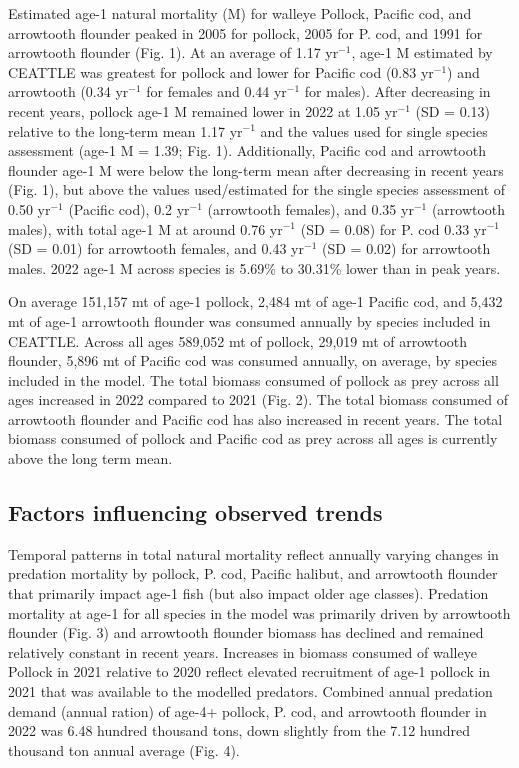 \documentclass[
]{article}
\begin{document}
Estimated age-1 natural mortality (M) for walleye Pollock, Pacific cod,
and arrowtooth flounder peaked in 2005 for pollock, 2005 for P. cod, and
1991 for arrowtooth flounder (Fig. 1). At an average of 1.17
yr\(^{-1}\), age-1 M estimated by CEATTLE was greatest for pollock and
lower for Pacific cod (0.83 yr\(^{-1}\)) and arrowtooth (0.34
yr\(^{-1}\) for females and 0.44 yr\(^{-1}\) for males). After
decreasing in recent years, pollock age-1 M remained lower in 2022 at
1.05 yr\(^{-1}\) (SD = 0.13) relative to the long-term mean 1.17
yr\(^{-1}\) and the values used for single species assessment (age-1 M =
1.39; Fig. 1). Additionally, Pacific cod and arrowtooth flounder age-1 M
were below the long-term mean after decreasing in recent years (Fig. 1),
but above the values used/estimated for the single species assessment of
0.50 yr\(^{-1}\) (Pacific cod), 0.2 yr\(^{-1}\) (arrowtooth females),
and 0.35 yr\(^{-1}\) (arrowtooth males), with total age-1 M at around
0.76 yr\(^{-1}\) (SD = 0.08) for P. cod 0.33 yr\(^{-1}\) (SD = 0.01) for
arrowtooth females, and 0.43 yr\(^{-1}\) (SD = 0.02) for arrowtooth
males. 2022 age-1 M across species is 5.69\% to 30.31\% lower than in
peak years.

On average 151,157 mt of age-1 pollock, 2,484 mt of age-1 Pacific cod,
and 5,432 mt of age-1 arrowtooth flounder was consumed annually by
species included in CEATTLE. Across all ages 589,052 mt of pollock,
29,019 mt of arrowtooth flounder, 5,896 mt of Pacific cod was consumed
annually, on average, by species included in the model. The total
biomass consumed of pollock as prey across all ages increased in 2022
compared to 2021 (Fig. 2). The total biomass consumed of arrowtooth
flounder and Pacific cod has also increased in recent years. The total
biomass consumed of pollock and Pacific cod as prey across all ages is
currently above the long term mean.

\hypertarget{factors-influencing-observed-trends}{%
\subsection{Factors influencing observed
trends}\label{factors-influencing-observed-trends}}

Temporal patterns in total natural mortality reflect annually varying
changes in predation mortality by pollock, P. cod, Pacific halibut, and
arrowtooth flounder that primarily impact age-1 fish (but also impact
older age classes). Predation mortality at age-1 for all species in the
model was primarily driven by arrowtooth flounder (Fig. 3) and
arrowtooth flounder biomass has declined and remained relatively
constant in recent years. Increases in biomass consumed of walleye
Pollock in 2021 relative to 2020 reflect elevated recruitment of age-1
pollock in 2021 that was available to the modelled predators. Combined
annual predation demand (annual ration) of age-4+ pollock, P. cod, and
arrowtooth flounder in 2022 was 6.48 hundred thousand tons, down
slightly from the 7.12 hundred thousand ton annual average (Fig. 4).
\end{document}
